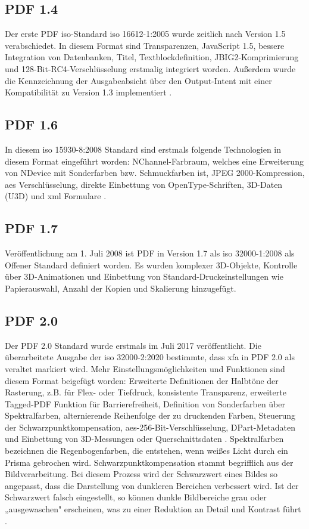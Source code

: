 \subsection{PDF 1.4}
Der erste PDF \gls{iso}-Standard \gls{iso} 16612-1:2005 wurde zeitlich nach Version 1.5 verabschiedet. In diesem Format sind Transparenzen, JavaScript 1.5, bessere Integration von Datenbanken, Titel, Textblockdefinition, JBIG2-Komprimierung und 128-Bit-RC4-Verschlüsselung erstmalig integriert worden\cite{proj-consult}. Außerdem wurde die Kennzeichnung der Ausgabeabsicht über den Output-Intent mit einer Kompatibilität zu Version 1.3 implementiert \cite{schneeberger}.

\subsection{PDF 1.6}
In diesem \gls{iso} 15930-8:2008 Standard sind erstmals folgende Technologien in diesem Format eingeführt worden: NChannel-Farbraum, welches eine Erweiterung von NDevice mit Sonderfarben bzw. Schmuckfarben ist, JPEG 2000-Kompression, \gls{aes} Verschlüsselung, direkte Einbettung von OpenType-Schriften, 3D-Daten (U3D) und \gls{xml} Formulare \cite{proj-consult}.

\subsection{PDF 1.7}
Veröffentlichung am 1. Juli 2008 ist PDF in Version 1.7 als \gls{iso} 32000-1:2008 als Offener Standard definiert worden. Es wurden komplexer 3D-Objekte, Kontrolle über 3D-Animationen und Einbettung von Standard-Druckeinstellungen wie Papierauswahl, Anzahl der Kopien und Skalierung hinzugefügt\cite{proj-consult}.


\subsection{PDF 2.0}
Der PDF 2.0 Standard wurde erstmals im Juli 2017 veröffentlicht. Die überarbeitete Ausgabe der \gls{iso} 32000-2:2020 bestimmte, dass \gls{xfa} in PDF 2.0 als veraltet markiert wird. Mehr Einstellungsmöglichkeiten und Funktionen sind diesem Format beigefügt worden: Erweiterte Definitionen der Halbtöne der Rasterung, z.B. für Flex- oder Tiefdruck, konsistente Transparenz, erweiterte Tagged-PDF Funktion für Barrierefreiheit, Definition von Sonderfarben über Spektralfarben, alternierende Reihenfolge der zu druckenden Farben, Steuerung der Schwarzpunktkompensation, \gls{aes}-256-Bit-Verschlüsselung, DPart-Metadaten und Einbettung von 3D-Messungen oder Querschnittsdaten \cite{proj-consult}.
Spektralfarben bezeichnen die Regenbogenfarben, die entstehen, wenn weißes Licht durch ein Prisma gebrochen wird. Schwarzpunktkompensation stammt begrifflich aus der Bildverarbeitung. Bei diesem Prozess wird der Schwarzwert eines Bildes so angepasst, dass die Darstellung von dunkleren Bereichen verbessert wird. Ist der Schwarzwert falsch eingestellt, so können dunkle Bildbereiche grau oder „ausgewaschen" erscheinen, was zu einer Reduktion an Detail und Kontrast führt \cite{schwarz}.